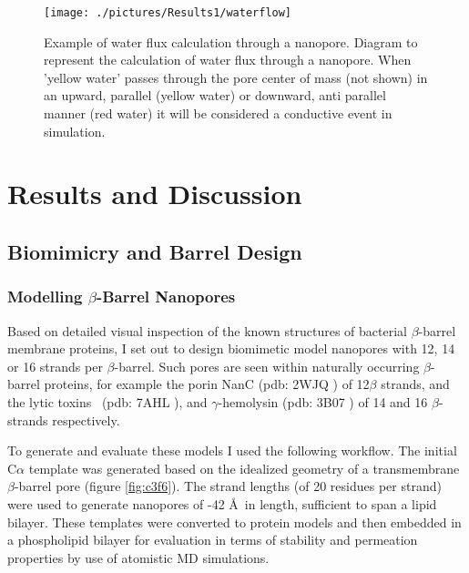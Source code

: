 \begin{figure}[H]
\begin{center}
\texttt{[image: ./pictures/Results1/waterflow]}
\caption[Example of water flux calculation through a nanopore] {Example of water flux calculation through a nanopore. Diagram to represent the calculation of water flux through a nanopore. When 'yellow water' passes through the pore center of mass (not shown) in an upward, parallel (yellow water) or downward, anti parallel manner (red water) it will be considered a conductive event in simulation.} 
\label{fig:waterflow}
\end{center}
\end{figure}


\section{Results and Discussion}

\subsection{Biomimicry and Barrel Design}

\subsubsection{Modelling $\beta$-Barrel Nanopores}
Based on detailed visual inspection of the known structures of bacterial $\beta$-barrel membrane proteins, I set out to design biomimetic model nanopores with 12, 14 or 16 strands per $\beta$-barrel. Such pores are seen within naturally occurring $\beta$-barrel proteins, for example the porin NanC (pdb: 2WJQ \cite{Wirth2009}) of 12$\beta$ strands, and the lytic toxins \ahl\  (pdb: 7AHL \cite{Song1996}), and $\gamma$-hemolysin (pdb: 3B07 \cite{Yamashita2011}) of 14 and 16 $\beta$-strands respectively. 

To generate and evaluate these models I used the following workflow. The initial C$\alpha$ template was generated based on the idealized geometry of a transmembrane $\beta$-barrel pore (figure \ref{fig:c3f6}). The strand lengths (of 20 residues per strand) were used to generate nanopores of -42 \AA\ in length, sufficient to span a lipid bilayer. These templates were converted to protein models and then embedded in a phospholipid bilayer for evaluation in terms of stability and permeation properties by use of atomistic MD simulations. 

